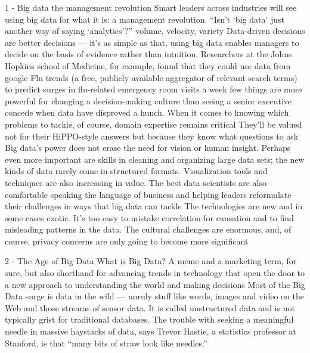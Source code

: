 1 - Big data the management revolution
Smart leaders across industries will see using big data for what it is: a management revolution.
``Isn't `big data' just another way of saying `analytics'?'' volume, velocity, variety
Data-driven decisions are better decisions — it's as simple as that. using big data enables managers to decide on the basis of evidence rather than intuition.
Researchers at the Johns Hopkins school of Medicine, for example, found that they could use data from google Flu trends (a free, publicly available aggregator of relevant search terms) to predict surges in flu-related emergency room visits a week
few things are more powerful for changing a decision-making culture than seeing a senior executive concede when data have disproved a hunch.
When it comes to knowing which problems to tackle, of course, domain expertise remains critical
They'll be valued not for their HiPPO-style answers but because they know what questions to ask
Big data's power does not erase the need for vision or human insight.
Perhaps even more important are skills in cleaning and organizing large data sets; the new kinds of data rarely come in structured formats. Visualization tools and techniques are also increasing in value.
The best data scientists are also comfortable speaking the language of business and helping leaders reformulate their challenges in ways that big data can tackle
The technologies are new and in some cases exotic. 
It's too easy to mistake correlation for causation and to find misleading patterns in the data. 
The cultural challenges are enormous, and, of course, privacy concerns are only going to become more significant

2 - The Age of Big Data
What is Big Data? A meme and a marketing term, for sure, but also shorthand for advancing trends in technology that open the door to a new approach to understanding the world and making decisions
Most of the Big Data surge is data in the wild — unruly stuff like words, images and video on the Web and those streams of sensor data. It is called unstructured data and is not typically grist for traditional databases.
The trouble with seeking a meaningful needle in massive haystacks of data, says Trevor Hastie, a statistics professor at Stanford, is that “many bits of straw look like needles.”

